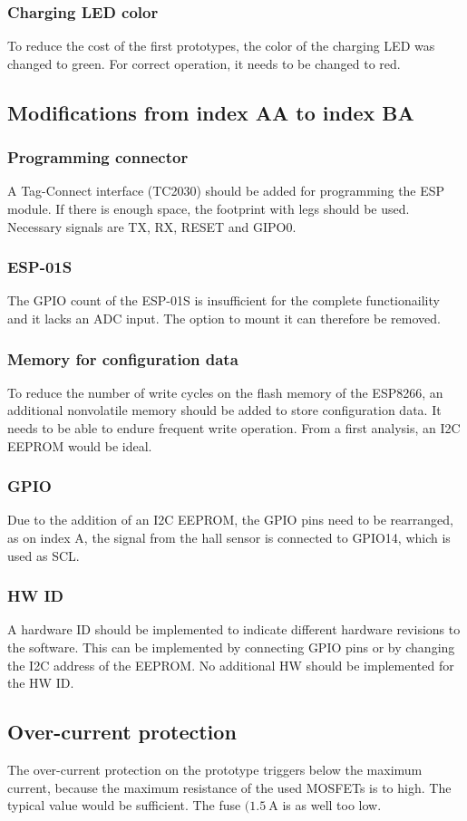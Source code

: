 \subsubsection{Charging LED color}
To reduce the cost of the first prototypes, the color of the charging \ac{LED} was changed to green. For correct operation, it needs to be changed to red. 

\subsection{Modifications from index AA to index BA}

\subsubsection{Programming connector}
A Tag-Connect interface (TC2030) should be added for programming the ESP module. If there is enough space, the footprint with legs should be used. Necessary signals are TX, RX, RESET and GIPO0. 

\subsubsection{ESP-01S}
The GPIO count of the ESP-01S is insufficient for the complete functionaility and it lacks an \ac{ADC} input. The option to mount it can therefore be removed. 

\subsubsection{Memory for configuration data}
To reduce the number of write cycles on the flash memory of the ESP8266, an additional nonvolatile memory should be added to store configuration data. It needs to be able to endure frequent write operation. From a first analysis, an \ac{I2C} \ac{EEPROM} would be ideal. 

\subsubsection{GPIO}
Due to the addition of an \ac{I2C} \ac{EEPROM}, the \ac{GPIO} pins need to be rearranged, as on index A, the signal from the hall sensor is connected to GPIO14, which is used as SCL. 

\subsubsection{HW ID}
A hardware ID should be implemented to indicate different hardware revisions to the software. This can be implemented by connecting GPIO pins or by changing the I2C address of the EEPROM. No additional HW should be implemented for the HW ID. 

\subsection{Over-current protection}
The over-current protection on the prototype triggers below the maximum current, because the maximum resistance of the used MOSFETs is to high. The typical value would be sufficient. The fuse $(\SI{1.5}{\A}$ is as well too low. 